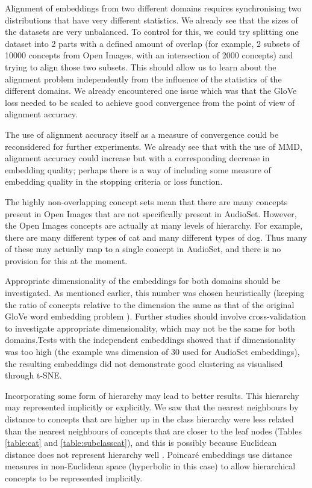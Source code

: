 Alignment of embeddings from two different domains requires synchronising two distributions that have very different statistics. We already see that the sizes of the datasets are very unbalanced. To control for this, we could try splitting one dataset into 2 parts with a defined amount of overlap (for example, 2 subsets of 10000 concepts from Open Images, with an intersection of 2000 concepts) and trying to align those two subsets. This should allow us to learn about the alignment problem independently from the influence of the statistics of the different domains. We already encountered one issue which was that the GloVe loss needed to be scaled to achieve good convergence from the point of view of alignment accuracy. 

The use of alignment accuracy itself as a measure of convergence could be reconsidered for further experiments. We already see that with the use of MMD, alignment accuracy could increase but with a corresponding decrease in embedding quality; perhaps there is a way of including some measure of embedding quality in the stopping criteria or loss function.  

The highly non-overlapping concept sets mean that there are many concepts present in Open Images that are not specifically present in AudioSet. However, the Open Images concepts are actually at many levels of hierarchy. For example, there are many different types of cat and many different types of dog. Thus many of these may actually map to a single concept in AudioSet, and there is no provision for this at the moment. 

Appropriate dimensionality of the embeddings for both domains should be investigated. As mentioned earlier, this number was chosen heuristically (keeping the ratio of concepts relative to the dimension the same as that of the original GloVe word embedding problem \cite{pennington2014glove}). Further studies should involve cross-validation to investigate appropriate dimensionality, which may not be the same for both domains.Tests with the independent embeddings showed that if dimensionality was too high (the example was dimension of 30 used for AudioSet embeddings), the resulting embeddings did not demonstrate good clustering as visualised through t-SNE. 

Incorporating some form of hierarchy may lead to better results. This hierarchy may represented implicitly or explicitly.   We saw that the nearest neighbours by distance to concepts that are higher up in the class hierarchy were less related than the nearest neighbours of concepts that are closer to the leaf nodes (Tables \ref{table:cat} and \ref{table:subclasscat}), and this is possibly because Euclidean distance does not represent hierarchy well \cite{NNAnalysisPsychologicalSpaces}. Poincar{\'{e}} embeddings \cite{PoincareEmbeddings} use distance measures in non-Euclidean space (hyperbolic in this case) to allow hierarchical concepts to be represented implicitly.

